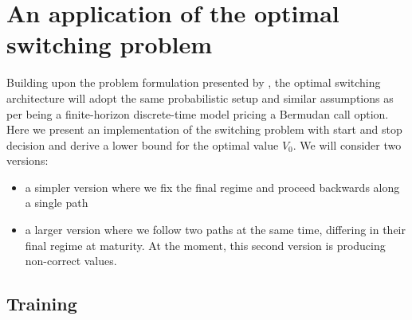 \documentclass{article}
\begin{document}
\section{An application of the optimal switching problem}
Building upon the problem formulation presented by \cite{becker2019deep}, the optimal switching architecture will adopt the same probabilistic setup and similar assumptions as per being a finite-horizon discrete-time model pricing a Bermudan call option. Here we present an implementation of the switching problem with start and stop decision and derive a lower bound for the optimal value $V_0$. We will consider two versions:
\begin{itemize}
    \item a simpler version where we fix the final regime and proceed backwards along a single path
    \item a larger version where we follow two paths at the same time, differing in their final regime at maturity. At the moment, this second version is producing non-correct values.
\end{itemize}


\subsection{Training}
\end{document}
